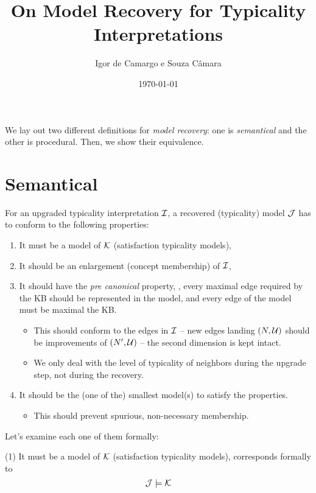 \documentclass[draft]{article}
\title{On Model Recovery for Typicality Interpretations}
\author{Igor de Camargo e Souza Câmara}
\date{\today}
\begin{document}
\maketitle

We lay out two different definitions for \emph{model recovery}: one is \emph{semantical} and the other is procedural.
Then, we show their equivalence.

\section{Semantical}


For an upgraded typicality interpretation $\mathcal{I}$, a recovered (typicality) model $\mathcal{J}$ has to conform to the following properties:

\begin{enumerate}
  \item It must be a model of $\mathcal{K}$ (satisfaction \wrt typicality models), 
  \item It should be an enlargement (\wrt concept membership) of $\mathcal{I}$, 
  \item It should have the \emph{pre canonical} property, \ie, every maximal edge required by the KB should be represented in the model, and every edge of the model must be maximal \wrt the KB. 
  \begin{itemize}
    \item This should conform to the edges in $\mathcal{I}$ -- new edges landing $(N, \mathcal{U})$ should be improvements of $(N', \mathcal{U})$ -- the second dimension is kept intact.  
    \item We only deal with the level of typicality of neighbors during the upgrade step, not during the recovery. 
  \end{itemize}
  \item It should be the (one of the) smallest model(s) to satisfy the properties. 
  \begin{itemize}
    \item This should prevent spurious, non-necessary membership. 
  \end{itemize}
\end{enumerate}

Let's examine each one of them formally:


(1) It must be a model of $\mathcal{K}$ (satisfaction \wrt typicality models), corresponds formally to 
\begin{equation*}
  \mathcal{J} \models \mathcal{K}
\end{equation*}
\end{document}
